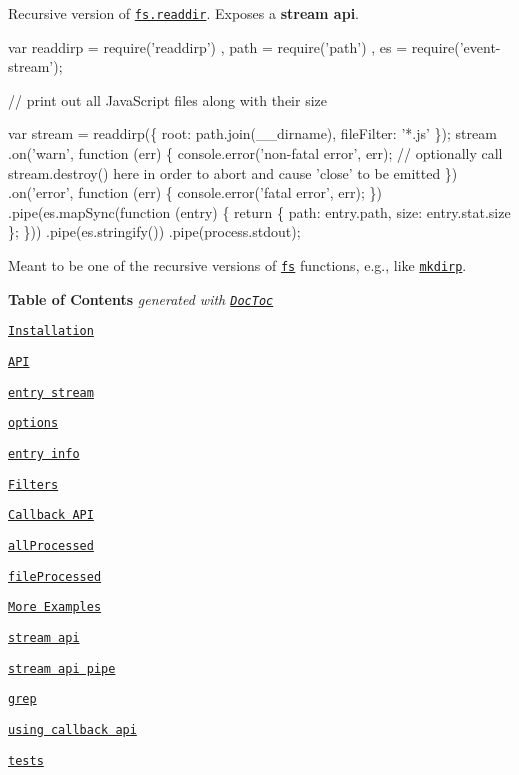 \href{https://nodei.co/npm/readdirp/}{\tt }

Recursive version of \href{http://nodejs.org/docs/latest/api/fs.html#fs_fs_readdir_path_callback}{\tt fs.\+readdir}. Exposes a {\bfseries stream api}.


\begin{DoxyCode}
var readdirp = require('readdirp')
  , path = require('path')
  , es = require('event-stream');

// print out all JavaScript files along with their size

var stream = readdirp(\{ root: path.join(\_\_dirname), fileFilter: '*.js' \});
stream
  .on('warn', function (err) \{ 
    console.error('non-fatal error', err); 
    // optionally call stream.destroy() here in order to abort and cause 'close' to be emitted
  \})
  .on('error', function (err) \{ console.error('fatal error', err); \})
  .pipe(es.mapSync(function (entry) \{ 
    return \{ path: entry.path, size: entry.stat.size \};
  \}))
  .pipe(es.stringify())
  .pipe(process.stdout);
\end{DoxyCode}


Meant to be one of the recursive versions of \href{http://nodejs.org/docs/latest/api/fs.html}{\tt fs} functions, e.\+g., like \href{https://github.com/substack/node-mkdirp}{\tt mkdirp}.

{\bfseries Table of Contents} {\itshape generated with \href{http://doctoc.herokuapp.com/}{\tt Doc\+Toc}}


\begin{DoxyItemize}
\item \href{#installation}{\tt Installation}
\item \href{#api}{\tt A\+PI}
\begin{DoxyItemize}
\item \href{#entry-stream}{\tt entry stream}
\item \href{#options}{\tt options}
\item \href{#entry-info}{\tt entry info}
\item \href{#filters}{\tt Filters}
\item \href{#callback-api}{\tt Callback A\+PI}
\begin{DoxyItemize}
\item \href{#allprocessed}{\tt all\+Processed}
\item \href{#fileprocessed}{\tt file\+Processed}
\end{DoxyItemize}
\end{DoxyItemize}
\item \href{#more-examples}{\tt More Examples}
\begin{DoxyItemize}
\item \href{#stream-api}{\tt stream api}
\item \href{#stream-api-pipe}{\tt stream api pipe}
\item \href{#grep}{\tt grep}
\item \href{#using-callback-api}{\tt using callback api}
\item \href{#tests}{\tt tests}
\end{DoxyItemize}
\end{DoxyItemize}

